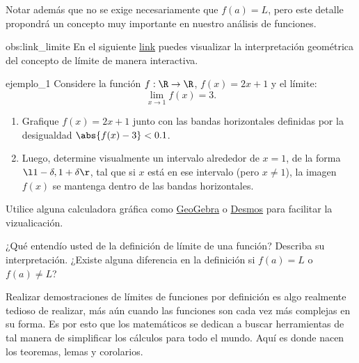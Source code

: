 \begin{center}
\end{center}

Notar además que no se exige necesariamente que $f(a) = L$, pero este detalle propondrá un concepto muy importante en nuestro análisis de funciones.

\begin{remark}{}{obs:link_limite}
  En el siguiente \href{https://ggbm.at/p8fsxasx}{link} puedes visualizar la interpretación geométrica del concepto de límite de manera interactiva.
\end{remark}

\begin{exercise}{}{ejemplo_1}
  Considere la función $f:\R \to \R$, $f(x) = 2x+1$ y el límite:
  \[\lim_{x \to 1}{f(x)} = 3. \]
  \begin{enumerate}
    \item Grafique $f(x)=2x+1$ junto con las bandas horizontales definidas por la desigualdad $\abs{f(x)-3}<0.1$.
    \item Luego, determine visualmente un intervalo alrededor de $x=1$, de la forma $\l 1-\delta , 1+\delta \r$, tal que si $x$ está en ese intervalo (pero $x \neq 1$), la imagen $f(x)$ se mantenga dentro de las bandas horizontales.
  \end{enumerate}
  Utilice alguna calculadora gráfica como \href{https://www.geogebra.org/calculator}{GeoGebra} o \href{https://www.desmos.com/calculator?lang=es}{Desmos} para facilitar la vizualicación.
\end{exercise}

\begin{question}{}{}
  ¿Qué entendío usted de la definición de límite de una función? Describa su interpretación. ¿Existe alguna diferencia en la definición si $f(a) = L$ o $f(a) \neq L$?
\end{question}

Realizar demostraciones de límites de funciones por definición es algo realmente tedioso de realizar, más aún cuando las funciones son cada vez más complejas en su forma. Es por esto que los matemáticos se dedican a buscar herramientas de tal manera de simplificar los cálculos para todo el mundo. Aquí es donde nacen los teoremas, lemas y corolarios.

